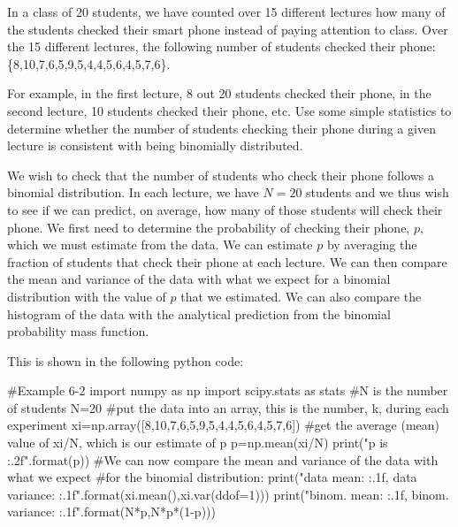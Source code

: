 \begin{example}{In a class of 20 students, we have counted over 15 different lectures how many of the students checked their smart phone instead of paying attention to class. Over the 15 different lectures, the following number of students checked their phone:\\ \{8,10,7,6,5,9,5,4,4,5,6,4,5,7,6\}. 

For example, in the first lecture, 8 out 20 students checked their phone, in the second lecture, 10 students checked their phone, etc. Use some simple statistics to determine whether the number of students checking their phone during a given lecture is consistent with being binomially distributed.}
\label{ex:BinomialPhones}
We wish to check that the number of students who check their phone follows a binomial distribution. In each lecture, we have $N=20$ students and we thus wish to see if we can predict, on average, how many of those students will check their phone. We first need to determine the probability of checking their phone, $p$, which we must estimate from the data. We can estimate $p$ by averaging the fraction of students that check their phone at each lecture. We can then compare the mean and variance of the data with what we expect for a binomial distribution with the value of $p$ that we estimated. We can also compare the histogram of the data with the analytical prediction from the binomial probability mass function.

This is shown in the following python code:
\begin{python}[caption = Evaluating binomial quantities] 
#Example 6-2
import numpy as np
import scipy.stats as stats
#N is the number of students
N=20
#put the data into an array, this is the number, k, during each experiment
xi=np.array([8,10,7,6,5,9,5,4,4,5,6,4,5,7,6])
#get the average (mean) value of xi/N, which is our estimate of p
p=np.mean(xi/N)
print("p is {:.2f}".format(p))
#We can now compare the mean and variance of the data with what we expect 
#for the binomial distribution:
print("data mean: {:.1f}, data variance: {:.1f}".format(xi.mean(),xi.var(ddof=1)))
print("binom. mean: {:.1f}, binom. variance: {:.1f}".format(N*p,N*p*(1-p)))


\end{python}
\end{example}
